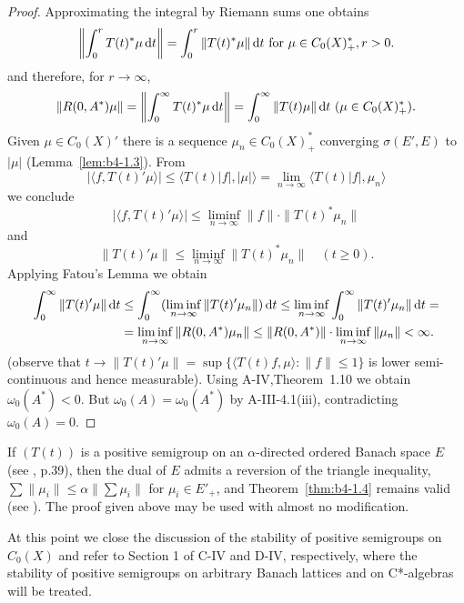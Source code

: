 \begin{proof}
Approximating the integral by Riemann sums one obtains 
\[
\left\|\int_0^r T(t)^*\mu \mathop{}\!\mathrm{d}{t}\right\| = \int_0^r \|T(t)^*\mu\| \mathop{}\!\mathrm{d}{t} \text{ for } \mu \in C_{0}(X)^*_{+} , r  >  0 .
\]
and therefore, for $r \to \infty$, 
\[
\|R(0,A^*)\mu\| = \left\|\int_0^{\infty} T(t)^*\mu \mathop{}\!\mathrm{d}{t}\right\| 
 = \int_0^{\infty} \|T(t)\mu\| \mathop{}\!\mathrm{d}{t}\  (\mu \in C_{0}(X)_{+}^{*}) .
\]
Given $\mu \in C_{0}(X)'$ there is a sequence $\mu_n \in C_{0}(X)^*_+$ converging $\sigma(E',E)$ to $|\mu|$ (Lemma~\ref{lem:b4-1.3}).
From 
%
\[
	 |\langle f,T(t)'\mu \rangle| \leq \langle T(t)|f|,|\mu| \rangle = \lim_{n\to\infty} \langle T(t)|f|,\mu_n \rangle 
\]
%
we conclude 
%
\[
	 |\langle f,T(t)'\mu \rangle| \leq \liminf_{n\to\infty}\|f\| \cdot \|T(t)^*\mu_n\| 
\]
%
and 
%
\[
	 \|T(t)'\mu\| \leq \liminf_{n\to\infty}\|T(t)^*\mu_n\| \quad (t \geq 0) .
\]
%
Applying Fatou's Lemma we obtain 
\[
\begin{aligned}
	\int_0^{\infty} \|T(t)'\mu\| \mathop{}\!\mathrm{d}{t} &\leq \int_0^{\infty} (\liminf_{n\to\infty} \|T(t)'\mu_n\|) \mathop{}\!\mathrm{d}{t} \leq  
	\liminf_{n\to\infty} \int_0^{\infty} \|T(t)'\mu_n\| \mathop{}\!\mathrm{d}{t} = \\ 
	& = \liminf_{n\to\infty} \|R(0,A^{*})\mu_n\| \leq \|R(0,A^{*})\|\cdot\liminf_{n\to\infty} \|\mu_n\| < \infty .
\end{aligned}
\]
(observe that $t \to \|T(t)'\mu\| = \sup \{\langle T(t)f,\mu \rangle \colon \|f\| \leq 1\}$ is lower semi-continuous and hence measurable). 
Using A-IV,Theorem~1.10 we obtain $\omega_{0}(A^{*})<0$. 
But $\omega_{0}(A) = \omega_{0}(A^{*})$ by A-III-4.1(iii), contradicting $\omega_{0}(A) = 0$.
\end{proof}

\begin{remark}\label{rem:b4-1.5}%
If $(T(t))$ is a positive semigroup on an $\alpha$-directed ordered Banach space $E$ (see \citet{asimow:1980}, p.39), 
then the dual of $E$ admits a reversion of the triangle inequality, 
\ie $\sum\|\mu_i\| \leq \alpha\|\sum\mu_i\|$ 
for $\mu_i \in E'_+$, 
and Theorem~\ref{thm:b4-1.4} remains valid (see \citet{battydavies:1983}). 
The proof given above may be used with almost no modification.
\end{remark}

At this point we close the discussion of the stability of positive semigroups on $C_{0}(X)$ and refer to Section 1 of C-IV and D-IV, respectively, where the stability of positive semigroups on arbitrary Banach lattices and on C*-algebras will be treated.

